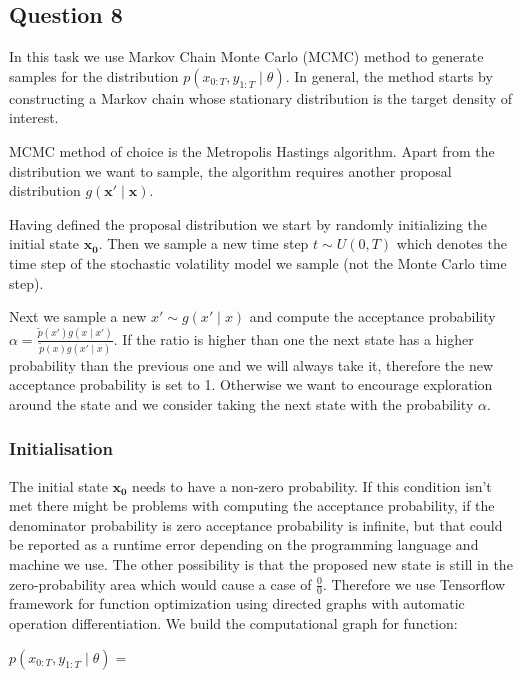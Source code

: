\documentclass[]{article}
\begin{document}
	
	
	\subsection*{Question 8}
	In this task we use Markov Chain Monte Carlo (MCMC) method to generate samples for the distribution $p(x_{0:T}, y_{1:T} \mid \theta)$. In general, the method starts by constructing a Markov chain whose stationary distribution is the target density of interest. 
	
	MCMC method of choice is the Metropolis Hastings algorithm.
	Apart from the distribution we want to sample, the algorithm requires another proposal distribution $g(\mathbf{x'} \mid \mathbf{x})$.
	
	
	Having defined the proposal distribution we start by randomly initializing the initial state $\mathbf{x_0}$. Then we sample a new time step $ t \sim U(0,T)$ which denotes the time step of the stochastic volatility model we sample (not the Monte Carlo time step). 
	
	Next we sample a new $x' \sim g(x' \mid x)$ and compute the acceptance probability $ \alpha = \frac{ \widetilde{p}(x')g(x \mid x') }{  \widetilde{p}(x)g(x' \mid x) }$. If the ratio is higher than one the next state has a higher probability than the previous one and we will always take it, therefore the new acceptance probability is set to 1. Otherwise we want to encourage exploration around the state and we consider taking the next state with the probability $\alpha$.  
	
	\subsubsection*{Initialisation}
	
	The initial state $\mathbf{x_0}$ needs to have a non-zero probability. If this condition isn't met there might be problems with computing the acceptance probability, if the denominator probability is zero acceptance probability is infinite, but that could be reported as a runtime error depending on the programming language and machine we use. The other possibility is that the proposed new state is still in the zero-probability area which would cause a case of $\frac{0}{0}$. Therefore we use Tensorflow framework for function optimization using directed graphs with automatic operation differentiation. We build the computational graph for function:
	
	$ p(x_{0:T}, y_{1:T} \mid \theta) = $
	
\end{document}
